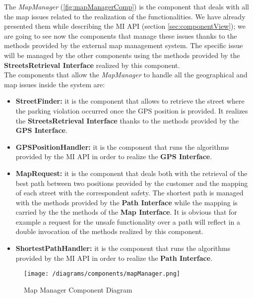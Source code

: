 			The \emph{MapManager} (\autoref{fig:mapManagerComp}) is the component that deals with all the map issues related to the realization of the functionalities. We have already presented them while describing the MI API (section \ref{sec:componentView}); we are going to see now the components that manage these issues thanks to the methods provided by the external map management system. The specific issue will be managed by the other components using the methods provided by the \textbf{StreetsRetrieval Interface} realized by this component.\\
			
			The components that allow the \emph{MapManager} to handle all the geographical and map issues inside the system are:
			
			\begin{itemize}
				\item \textbf{StreetFinder:} it is the component that allows to retrieve the street where the parking violation occurred once the GPS position is provided. It realizes the \textbf{StreetsRetrieval Interface} thanks to the methods provided by the \textbf{GPS Interface}.
				
				\item \textbf{GPSPositionHandler:} it is the component that runs the algorithms provided by the MI API in order to realize the \textbf{GPS Interface}.
				
				\item \textbf{MapRequest:} it is the component that deals both with the retrieval of the best path between two positions provided by the customer and the mapping of each street with the correspondent safety. The shortest path is managed with the methods provided by the \textbf{Path Interface} while the mapping is carried by the the methods of the \textbf{Map Interface}. It is obvious that for example a request for the unsafe functionality over a path will reflect in a double invocation of the methods realized by this component.
				
				\item \textbf{ShortestPathHandler:} it is the component that runs the algorithms provided by the MI API in order to realize the \textbf{Path Interface}.
			\end{itemize}
			
			\begin{figure}[ht]
				\centering
				\texttt{[image: /diagrams/components/mapManager.png]}
				\caption{\label{fig:mapManagerComp} Map Manager Component Diagram}
			\end{figure}
		
